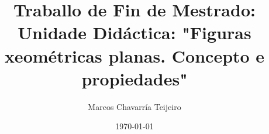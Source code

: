 \documentclass[a4paper,11pt,twoside,openright]{book}
\title{Traballo de Fin de Mestrado: Unidade Didáctica: "Figuras xeométricas planas. Concepto e propiedades"}
\author{Marcos Chavarría Teijeiro}
\date{\today}
\begin{document}
    \renewcommand{\listtablename}{Índice de táboas}
    \renewcommand{\tablename}{Táboa}
    \renewcommand{\contentsname}{Índice xeral}
    \renewcommand{\bibsection}{\section{\bibname}}
    \renewcommand{\bibname}{Referencias bibliográficas}
    \renewcommand{\BBAA}{e}  %
    \renewcommand{\BBAB}{e}  %
    \renewcommand{\BAnd}{e}  %
     \renewcommand{\BOthers}{e cols}

        

        \mainmatter

        {\tableofcontents \let\cleardoublepage\clearpage \listoffigures}

        
        
        
        
        


        \appendix
        
        
\end{document}
